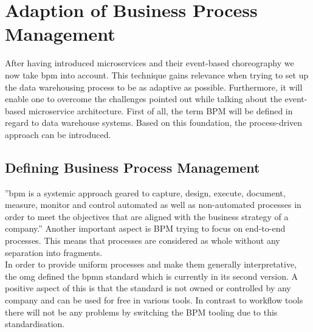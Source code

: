 \section{Adaption of Business Process Management}
\label{sec:bpm}
After having introduced microservices and their event-based choreography we now take \acrfull{bpm} into account. This technique gains relevance when trying to set up the data warehousing process to be as adaptive as possible. Furthermore, it will enable one to overcome the challenges pointed out while talking about the event-based microservice architecture.\newline
First of all, the term BPM will be defined in regard to data warehouse systems. Based on this foundation, the process-driven approach can be introduced. 

\subsection{Defining Business Process Management}
''\acrfull{bpm} is a systemic approach geared to capture, design, execute, document, measure, monitor and control automated as well as non-automated processes in order to meet the objectives that are aligned with the business strategy of a company.'' \cite{bpmDef} Another important aspect is BPM trying to focus on end-to-end processes. This means that processes are considered as whole without any separation into fragments. \cite{praxisBPM}\newline
\\
In order to provide uniform processes and make them generally interpretative, the \acrfull{omg} defined the \acrfull{bpmn} standard which is currently in its second version. A positive aspect of this is that the standard is not owned or controlled by any company and can be used for free in various tools. In contrast to workflow tools there will not be any problems by switching the BPM tooling due to this standardisation. \cite{bpmMethodStyle}


